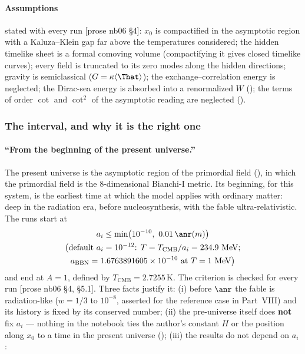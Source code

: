 \paragraph{Assumptions} stated with every run [prose nb06 \S4]: $x_0$ is compactified in the asymptotic
region with a Kaluza--Klein gap far above the temperatures considered; the hidden timelike sheet is a
formal comoving volume (compactifying it gives closed timelike curves); every field is truncated to its zero
modes along the hidden directions; gravity is semiclassical ($G=\kappa\langle\That\rangle$); the
exchange--correlation energy is neglected; the Dirac-sea energy is absorbed into a renormalized $W$
(); the terms of order $\cot$ and $\cot^2$ of the asymptotic reading are neglected
().

\subsubsection{The interval, and why it is the right one}
\label{sec:4.7.2}

\paragraph{``From the beginning of the present universe.''} The present universe is the asymptotic region
of the primordial field (), in which the primordial field is the 8-dimensional Bianchi-I
metric. Its beginning, for this system, is the earliest time at which the model applies with ordinary
matter: deep in the radiation era, before nucleosynthesis, with the fable ultra-relativistic. The runs start
at
\begin{gather*}
  a_i\leq\min\bigl(10^{-10},\ 0.01\,\anr(m)\bigr)\\
  \bigl(\text{default } a_i=10^{-12}\text{: } T=T_{\mathrm{CMB}}/a_i=234.9\ \text{MeV};\\
  a_{\mathrm{BBN}}=1.6763891605\times10^{-10}\text{ at } T=1\ \text{MeV}\bigr)
\end{gather*}
and end at $A=1$, defined by $T_{\mathrm{CMB}}=2.7255$\,K. The criterion is checked for every run [prose nb06
\S4, \S5.1]. Three facts justify it: (i) before $\anr$ the fable is radiation-like ($w=1/3$ to $10^{-8}$,
asserted for the reference case in Part~VIII) and its history is fixed by its conserved number; (ii) the
pre-universe itself does \textbf{not} fix $a_i$ --- nothing in the notebook ties the author's constant $H$ or
the position along $x_0$ to a time in the present universe (); (iii) the results do not
depend on $a_i$ :

